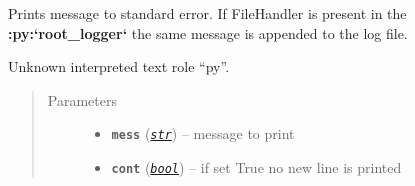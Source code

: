 \documentclass[a4paper,10pt,english]{sphinxmanual}
\begin{document}
\begin{fulllineitems}
\label{aqueduct.utils.clui:aqueduct.utils.clui.emit_message_to_file_in_root_logger}
\end{fulllineitems}


\begin{fulllineitems}
\label{aqueduct.utils.clui:aqueduct.utils.clui.message}
Prints message to standard error.
If FileHandler is present in the {\color{red}\bfseries{}:py:{}`root\_logger{}`} the same message is appended to the log file.

Unknown interpreted text role ``py''.

\begin{quote}\begin{description}
\item[{Parameters}] \leavevmode\begin{itemize}
\item {} 
\textbf{\texttt{mess}} (\href{https://docs.python.org/2/library/functions.html\#str}{\emph{\texttt{str}}}) -- message to print

\item {} 
\textbf{\texttt{cont}} (\href{https://docs.python.org/2/library/functions.html\#bool}{\emph{\texttt{bool}}}) -- if set True no new line is printed

\end{itemize}

\end{description}\end{quote}

\end{fulllineitems}

\end{document}
